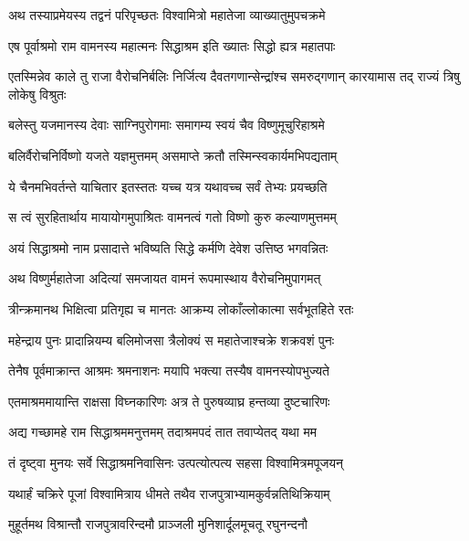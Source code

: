 
\twolineshloka
{अथ तस्याप्रमेयस्य तद्वनं परिपृच्छतः}
{विश्वामित्रो महातेजा व्याख्यातुमुपचक्रमे} %

\twolineshloka
{एष पूर्वाश्रमो राम वामनस्य महात्मनः}
{सिद्धाश्रम इति ख्यातः सिद्धो ह्यत्र महातपाः} %

\threelineshloka
{एतस्मिन्नेव काले तु राजा वैरोचनिर्बलिः}
{निर्जित्य दैवतगणान्सेन्द्रांश्च समरुद्गणान्}
{कारयामास तद् राज्यं त्रिषु लोकेषु विश्रुतः} %

\twolineshloka
{बलेस्तु यजमानस्य देवाः साग्निपुरोगमाः}
{समागम्य स्वयं चैव विष्णुमूचुरिहाश्रमे} %

\twolineshloka
{बलिर्वैरोचनिर्विष्णो यजते यज्ञमुत्तमम्}
{असमाप्ते क्रतौ तस्मिन्स्वकार्यमभिपद्यताम्} %

\twolineshloka
{ये चैनमभिवर्तन्ते याचितार इतस्ततः}
{यच्च यत्र यथावच्च सर्वं तेभ्यः प्रयच्छति} %

\twolineshloka
{स त्वं सुरहितार्थाय मायायोगमुपाश्रितः}
{वामनत्वं गतो विष्णो कुरु कल्याणमुत्तमम्} %

\twolineshloka
{अयं सिद्धाश्रमो नाम प्रसादात्ते भविष्यति}
{सिद्धे कर्मणि देवेश उत्तिष्ठ भगवन्नितः} %

\twolineshloka
{अथ विष्णुर्महातेजा अदित्यां समजायत}
{वामनं रूपमास्थाय वैरोचनिमुपागमत्} %

\twolineshloka
{त्रीन्क्रमानथ भिक्षित्वा प्रतिगृह्य च मानतः}
{आक्रम्य लोकाँल्लोकात्मा सर्वभूतहिते रतः} %

\twolineshloka
{महेन्द्राय पुनः प्रादान्नियम्य बलिमोजसा}
{त्रैलोक्यं स महातेजाश्चक्रे शक्रवशं पुनः} %

\twolineshloka
{तेनैष पूर्वमाक्रान्त आश्रमः श्रमनाशनः}
{मयापि भक्त्या तस्यैष वामनस्योपभुज्यते} %

\twolineshloka
{एतमाश्रममायान्ति राक्षसा विघ्नकारिणः}
{अत्र ते पुरुषव्याघ्र हन्तव्या दुष्टचारिणः} %

\twolineshloka
{अद्य गच्छामहे राम सिद्धाश्रममनुत्तमम्}
{तदाश्रमपदं तात तवाप्येतद् यथा मम} %

\twolineshloka
{तं दृष्ट्वा मुनयः सर्वे सिद्धाश्रमनिवासिनः}
{उत्पत्योत्पत्य सहसा विश्वामित्रमपूजयन्} %

\twolineshloka
{यथार्हं चक्रिरे पूजां विश्वामित्राय धीमते}
{तथैव राजपुत्राभ्यामकुर्वन्नतिथिक्रियाम्} %

\twolineshloka
{मुहूर्तमथ विश्रान्तौ राजपुत्रावरिन्दमौ}
{प्राञ्जली मुनिशार्दूलमूचतू रघुनन्दनौ} %

